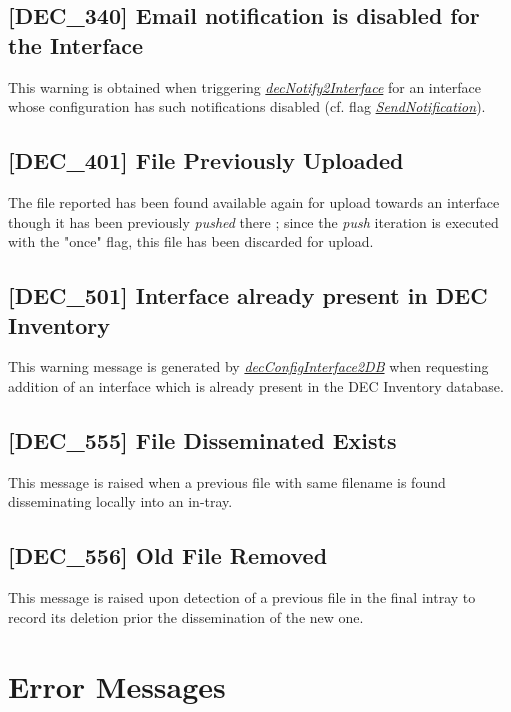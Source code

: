 \documentclass[dec_sum_main.tex]{subfiles}
\begin{document}
\label{DEC340}
\subsection{[DEC\_340] Email notification is disabled for the Interface}
This warning is obtained when triggering \hyperref[decNotify2Interface]{\textit{decNotify2Interface}} for an interface whose configuration has such notifications disabled (cf. flag \hyperref[SendNotification]{\textit{SendNotification}}).

\label{DEC401}
\subsection{[DEC\_401] File Previously Uploaded}
The file reported has been found available again for upload towards an interface though it has been previously \textit{pushed} there ; since the \textit{push} iteration is executed with the "once" flag, this file has been discarded for upload.

\label{DEC501}
\subsection{[DEC\_501] Interface already present in DEC Inventory}
This warning message is generated by \hyperref[decConfigInterface2DB]{\textit{decConfigInterface2DB}} when requesting addition of an interface which is already present in the DEC Inventory database.

\label{DEC555}
\subsection{[DEC\_555] File Disseminated Exists}
This message is raised when a previous file with same filename is found disseminating locally into an in-tray.

\label{DEC556}
\subsection{[DEC\_556] Old File Removed}
This message is raised upon detection of a previous file in the final intray to record its deletion prior the dissemination of the new one.


\newpage
\section{Error Messages}
\end{document}
